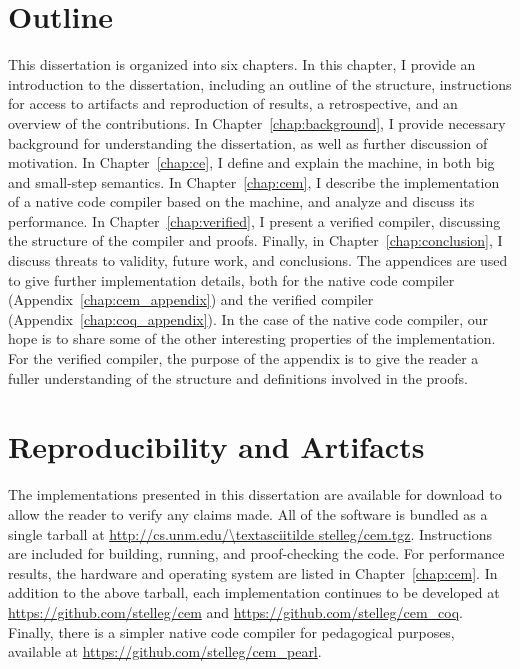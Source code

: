 \section{Outline}

This dissertation is organized into six chapters. In this chapter, I provide
an introduction to the dissertation, including an outline of the structure,
instructions for access to artifacts and reproduction of results, a
retrospective, and an overview of the contributions. In
Chapter~\ref{chap:background}, I provide necessary background for understanding
the dissertation, as well as further discussion of motivation. In
Chapter~\ref{chap:ce}, I define and explain the \ce machine, in both big and
small-step semantics. In Chapter~\ref{chap:cem}, I describe the implementation
of a native code compiler based on the \ce machine, and analyze and discuss its
performance. In Chapter~\ref{chap:verified}, I present a verified compiler,
discussing the structure of the compiler and proofs. Finally, in
Chapter~\ref{chap:conclusion}, I discuss threats to validity, future work, and
conclusions. The appendices are used to give further implementation details,
both for the native code compiler (Appendix~\ref{chap:cem_appendix}) and the
verified compiler (Appendix~\ref{chap:coq_appendix}). In the case of the native
code compiler, our hope is to share some of the other interesting properties of
the implementation.  For the verified compiler, the purpose of the appendix is
to give the reader a fuller understanding of the structure and definitions
involved in the proofs.

\section{Reproducibility and Artifacts}

The implementations presented in this dissertation are available for download to
allow the reader to verify any claims made. All of the software is bundled as
a single tarball at \url{http://cs.unm.edu/\textasciitilde stelleg/cem.tgz}.
Instructions are included for building, running, and proof-checking the code.
For performance results, the hardware and operating system are listed in
Chapter~\ref{chap:cem}. In addition to the above tarball, each implementation
continues to be developed at \url{https://github.com/stelleg/cem} and
\url{https://github.com/stelleg/cem\_coq}. Finally, there is a simpler native
code compiler for pedagogical purposes, available at
\url{https://github.com/stelleg/cem\_pearl}. 

